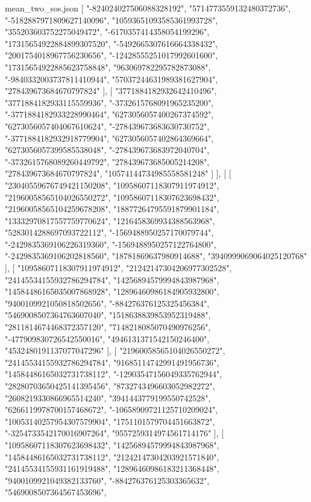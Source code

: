 \begin{filecontents*}[overwrite]{mean_two_sos.json}
   [
    "-824024027506088328192",
    "5714773559132480372736",
    "-5182887971809627140096",
    "10593651093585361993728",
    "355203603752275049472",
    "-6170357414358054199296",
    "17315654922884899307520",
    "-5492665307616664338432",
    "2001754018967756230656",
    "-12428555251017992601600",
    "17315654922885623758848",
    "963069782295782873088",
    "-9840332003737811410944",
    "57037244631989381627904",
    "278439673684670797824"
   ],
   [
    "3771884182932642410496",
    "3771884182933115559936",
    "-3732615768091965235200",
    "-3771884182933228990464",
    "6273056057400267374592",
    "6273056057404067610624",
    "-278439673683630730752",
    "-3771884182932918779904",
    "6273056057402864369664",
    "6273056057399585538048",
    "-278439673683972040704",
    "-3732615768089260449792",
    "278439673685005214208",
    "278439673684670797824",
    "10574144734985558581248"
   ]
  ],
  [
   [
    "23040559676749421150208",
    "10958607118307911974912",
    "21960058565104026550272",
    "10958607118307623698432",
    "21960058565104259678208",
    "18877264795591879901184",
    "13332970817557759770624",
    "1216458369934388563968",
    "5283014288697093722112",
    "-1569488950257170079744",
    "-2429835369106226319360",
    "-1569488950257122764800",
    "-2429835369106202818560",
    "18781869637980914688",
    "3940999069064025120768"
   ],
   [
    "10958607118307911974912",
    "21242147304206977302528",
    "24145534155932786294784",
    "14256894579994843987968",
    "14584486165035007868928",
    "12896460986184905932800",
    "9400109921050818502656",
    "-884276376125325456384",
    "5469008507364763607040",
    "1518638839853952319488",
    "2811814674468372357120",
    "7148218085070490976256",
    "-477909830726542550016",
    "4946131371542150246400",
    "4532480191137077047296"
   ],
   [
    "21960058565104026550272",
    "24145534155932786294784",
    "91685114742991491956736",
    "14584486165032731738112",
    "-12903547156049335762944",
    "28280703650425141395456",
    "8732743496603052982272",
    "2608219330866965514240",
    "3941443779199550742528",
    "6266119978700157468672",
    "-10658909721125710209024",
    "10053140257954307579904",
    "1751101579704451663872",
    "-3254733542170016907264",
    "9557259314974561714176"
   ],
   [
    "10958607118307623698432",
    "14256894579994843987968",
    "14584486165032731738112",
    "21242147304203921571840",
    "24145534155931161919488",
    "12896460986183211368448",
    "9400109921049382133760",
    "-884276376125303365632",
    "5469008507364567453696",

\end{filecontents*}
